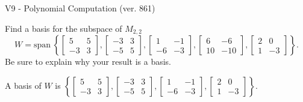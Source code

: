 \begin{exercise}
  \begin{exerciseTitle}V9 - Polynomial Computation (ver. 861)\end{exerciseTitle}
  \begin{exerciseStatement}
    Find a basis for the subspace of \(M_{2,2}\) 
\[W=\mathrm{span}\ \left\{\left[\begin{array}{cc}
5 & 5 \\
-3 & 3
\end{array}\right] , \left[\begin{array}{cc}
-3 & 3 \\
-5 & 5
\end{array}\right] , \left[\begin{array}{cc}
1 & -1 \\
-6 & -3
\end{array}\right] , \left[\begin{array}{cc}
6 & -6 \\
10 & -10
\end{array}\right] , \left[\begin{array}{cc}
2 & 0 \\
1 & -3
\end{array}\right]\right\}.\]
 Be sure to explain why your result is a basis.


  \end{exerciseStatement}
  \begin{exerciseAnswer}
   A basis of \(W\) is  \(\left\{\left[\begin{array}{cc}
5 & 5 \\
-3 & 3
\end{array}\right] , \left[\begin{array}{cc}
-3 & 3 \\
-5 & 5
\end{array}\right] , \left[\begin{array}{cc}
1 & -1 \\
-6 & -3
\end{array}\right] , \left[\begin{array}{cc}
2 & 0 \\
1 & -3
\end{array}\right]\right\}\).
  


  \end{exerciseAnswer}
\end{exercise}